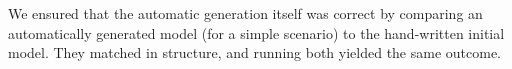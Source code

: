 %
%
%
%
%
%
%

We ensured that the automatic generation itself was correct by 
comparing an automatically generated model (for a simple scenario) 
to the hand-written initial model. They matched in structure, and running 
both yielded the same outcome. 

